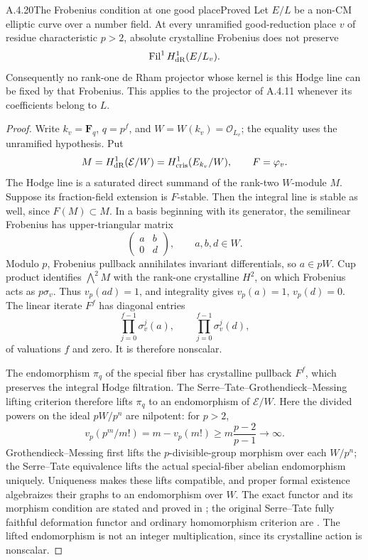 \begin{result}{A.4.20}{The Frobenius condition at one good place}{Proved}
Let $E/L$ be a non-CM elliptic curve over a number field. At every unramified good-reduction place $v$ of residue characteristic $p>2$, absolute crystalline Frobenius does not preserve
\[
 \operatorname{Fil}^1 H^1_{\mathrm{dR}}(E/L_v).
\]
Consequently no rank-one de Rham projector whose kernel is this Hodge line can be fixed by that Frobenius. This applies to the projector of A.4.11 whenever its coefficients belong to $L$.
\end{result}
\begin{proof}
Write $k_v=\mathbf F_q$, $q=p^f$, and $W=W(k_v)=\mathcal O_{L_v}$; the equality uses the unramified hypothesis. Put
\[
 M=H^1_{\mathrm{dR}}(\mathcal E/W)=H^1_{\mathrm{cris}}(E_{k_v}/W),
 \qquad F=\varphi_v.
\]
The Hodge line is a saturated direct summand of the rank-two $W$-module $M$. Suppose its fraction-field extension is $F$-stable. Then the integral line is stable as well, since $F(M)\subset M$. In a basis beginning with its generator, the semilinear Frobenius has upper-triangular matrix
\[
 \begin{pmatrix}a&b\\0&d\end{pmatrix},\qquad a,b,d\in W.
\]
Modulo $p$, Frobenius pullback annihilates invariant differentials, so $a\in pW$. Cup product identifies $\bigwedge^2M$ with the rank-one crystalline $H^2$, on which Frobenius acts as $p\sigma_v$. Thus $v_p(ad)=1$, and integrality gives $v_p(a)=1$, $v_p(d)=0$. The linear iterate $F^f$ has diagonal entries
\[
 \prod_{j=0}^{f-1}\sigma_v^j(a),\qquad
 \prod_{j=0}^{f-1}\sigma_v^j(d),
\]
of valuations $f$ and zero. It is therefore nonscalar.

The endomorphism $\pi_q$ of the special fiber has crystalline pullback $F^f$, which preserves the integral Hodge filtration. The Serre--Tate--Grothendieck--Messing lifting criterion therefore lifts $\pi_q$ to an endomorphism of $\mathcal E/W$. Here the divided powers on the ideal $pW/p^n$ are nilpotent: for $p>2$,
\[
v_p(p^m/m!)=m-v_p(m!)\geq m\frac{p-2}{p-1}\longrightarrow\infty.
\]
Grothendieck--Messing first lifts the $p$-divisible-group morphism over each $W/p^n$; the Serre--Tate equivalence lifts the actual special-fiber abelian endomorphism uniquely. Uniqueness makes these lifts compatible, and proper formal existence algebraizes their graphs to an endomorphism over $W$. The exact functor and its morphism condition are stated and proved in \cite[Theorem 3.4 and Remark 3.5, pp.12--13, and Appendix B]{EllPannyRobertSferlazza2026}; the original Serre--Tate fully faithful deformation functor and ordinary homomorphism criterion are \cite[Theorem 1.2.1 and Theorem 2.1(4), pp.143--145 and 149]{EllKatz1981}. The lifted endomorphism is not an integer multiplication, since its crystalline action is nonscalar.


\end{proof}
